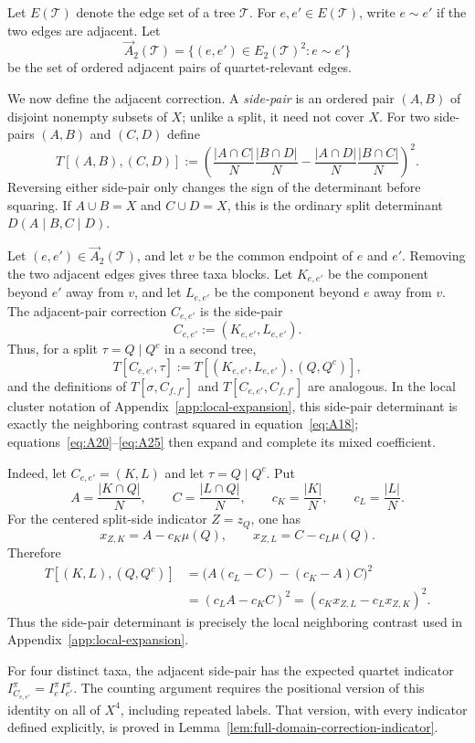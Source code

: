 \documentclass[11pt]{article}
\begin{document}
Let $E(\mathcal T)$ denote the edge set of a tree $\mathcal T$.  For
$e,e'\in E(\mathcal T)$, write $e\sim e'$ if the two edges are adjacent.  Let
\[
\overrightarrow A_2(\mathcal T)
=\{(e,e')\in E_2(\mathcal T)^2:e\sim e'\}
\]
be the set of ordered adjacent pairs of quartet-relevant edges.

We now define the adjacent correction.  A \emph{side-pair} is an ordered pair
$(A,B)$ of disjoint nonempty subsets of $X$; unlike a split, it need not cover
$X$.  For two side-pairs $(A,B)$ and $(C,D)$ define
\[
T[(A,B),(C,D)]
:=\left(
\frac{|A\cap C|}{N}\frac{|B\cap D|}{N}
-
\frac{|A\cap D|}{N}\frac{|B\cap C|}{N}
\right)^2.
\]
Reversing either side-pair only changes the sign of the determinant before squaring.  If $A\cup B=X$ and $C\cup D=X$, this is the ordinary split determinant $D(A\mid B,C\mid D)$.

Let $(e,e')\in\overrightarrow A_2(\mathcal T)$, and let $v$ be the common
endpoint of $e$ and $e'$.  Removing the two adjacent edges gives three taxa
blocks.  Let $K_{e,e'}$ be the component beyond $e'$ away from $v$, and let
$L_{e,e'}$ be the component beyond $e$ away from $v$.  The adjacent-pair
correction $C_{e,e'}$ is the side-pair
\[
C_{e,e'}:=(K_{e,e'},L_{e,e'}).
\]
Thus, for a split $\tau=Q\mid Q^c$ in a second tree,
\[
T[C_{e,e'},\tau]:=T[(K_{e,e'},L_{e,e'}),(Q,Q^c)],
\]
and the definitions of $T[\sigma,C_{f,f'}]$ and $T[C_{e,e'},C_{f,f'}]$ are analogous.  In the local cluster notation of Appendix~\ref{app:local-expansion}, this side-pair determinant is exactly the neighboring contrast squared in equation~\eqref{eq:A18}; equations~\eqref{eq:A20}--\eqref{eq:A25} then expand and complete its mixed coefficient.

Indeed, let $C_{e,e'}=(K,L)$ and let $\tau=Q\mid Q^c$.  Put
\[
A=\frac{|K\cap Q|}{N},\qquad C=\frac{|L\cap Q|}{N},
\qquad c_K=\frac{|K|}{N},\qquad c_L=\frac{|L|}{N}.
\]
For the centered split-side indicator $Z=z_Q$, one has
\[
x_{Z,K}=A-c_K\mu(Q),\qquad x_{Z,L}=C-c_L\mu(Q).
\]
Therefore
\[
\begin{aligned}
T[(K,L),(Q,Q^c)]
&=\bigl(A(c_L-C)-(c_K-A)C\bigr)^2\\
&=(c_LA-c_KC)^2
=(c_Kx_{Z,L}-c_Lx_{Z,K})^2.
\end{aligned}
\]
Thus the side-pair determinant is precisely the local neighboring contrast used in Appendix~\ref{app:local-expansion}.

For four distinct taxa, the adjacent side-pair has the expected quartet
indicator $I_{C_{e,e'}}^\pi=I_e^\pi I_{e'}^\pi$.  The counting argument
requires the positional version of this identity on all of $X^4$, including
repeated labels.  That version, with every indicator defined explicitly, is
proved in Lemma~\ref{lem:full-domain-correction-indicator}.
\end{document}
